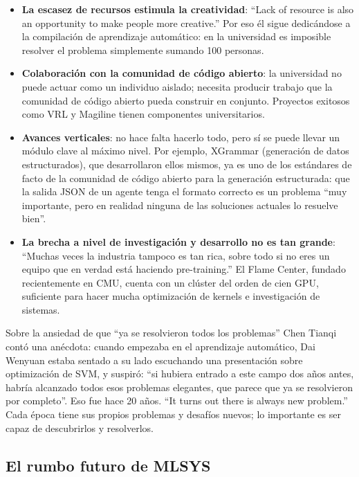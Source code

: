 \documentclass[a4paper]{article}
\begin{document}
\begin{itemize}
    \item \textbf{La escasez de recursos estimula la creatividad}: ``Lack of resource is also an opportunity to make people more creative.'' Por eso él sigue dedicándose a la compilación de aprendizaje automático: en la universidad es imposible resolver el problema simplemente sumando 100 personas.
    \item \textbf{Colaboración con la comunidad de código abierto}: la universidad no puede actuar como un individuo aislado; necesita producir trabajo que la comunidad de código abierto pueda construir en conjunto. Proyectos exitosos como VRL y Magiline tienen componentes universitarios.
    \item \textbf{Avances verticales}: no hace falta hacerlo todo, pero sí se puede llevar un módulo clave al máximo nivel. Por ejemplo, XGrammar (generación de datos estructurados), que desarrollaron ellos mismos, ya es uno de los estándares de facto de la comunidad de código abierto para la generación estructurada: que la salida JSON de un agente tenga el formato correcto es un problema ``muy importante, pero en realidad ninguna de las soluciones actuales lo resuelve bien''.
    \item \textbf{La brecha a nivel de investigación y desarrollo no es tan grande}: ``Muchas veces la industria tampoco es tan rica, sobre todo si no eres un equipo que en verdad está haciendo pre-training.'' El Flame Center, fundado recientemente en CMU, cuenta con un clúster del orden de cien GPU, suficiente para hacer mucha optimización de kernels e investigación de sistemas.
\end{itemize}

\begin{warningbox}{Sobre la ansiedad de que ``ya se resolvieron todos los problemas''}
Chen Tianqi contó una anécdota: cuando empezaba en el aprendizaje automático, Dai Wenyuan estaba sentado a su lado escuchando una presentación sobre optimización de SVM, y suspiró: ``si hubiera entrado a este campo dos años antes, habría alcanzado todos esos problemas elegantes, que parece que ya se resolvieron por completo''. Eso fue hace 20 años. ``It turns out there is always new problem.'' Cada época tiene sus propios problemas y desafíos nuevos; lo importante es ser capaz de descubrirlos y resolverlos.
\end{warningbox}

\subsection{El rumbo futuro de MLSYS}
\end{document}
